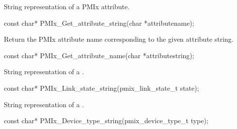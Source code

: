String representation of a \ac{PMIx} attribute.

\cspecificstart
\begin{codepar}
const char*
PMIx_Get_attribute_string(char *attributename);
\end{codepar}
\cspecificend

\summary
{}

Return the \ac{PMIx} attribute name corresponding to the given attribute string.

\cspecificstart
\begin{codepar}
const char*
PMIx_Get_attribute_name(char *attributestring);
\end{codepar}
\cspecificend

\summary
{}

String representation of a .

\cspecificstart
\begin{codepar}
const char*
PMIx_Link_state_string(pmix_link_state_t state);
\end{codepar}
\cspecificend

\summary
{}

String representation of a .

\cspecificstart
\begin{codepar}
const char*
PMIx_Device_type_string(pmix_device_type_t type);
\end{codepar}
\cspecificend


